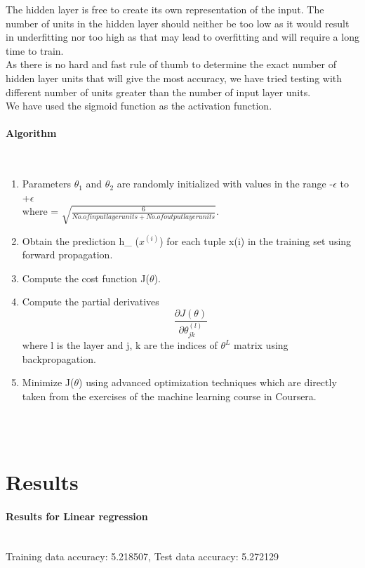 \documentclass[10pt]{article}
\begin{document}
The hidden layer is free to create its own representation of the input. The number of units in the hidden layer should neither be too low as it would result in underfitting nor too high as that may lead to overfitting and will require a long time to train.\\

As there is no hard and fast rule of thumb to determine the exact number of hidden layer units that will give the most accuracy, we have tried testing with different number of units greater than the number of input layer units.\\

We have used the sigmoid function as the activation function.

\paragraph{Algorithm}\\
\begin{enumerate}
	\item Parameters $\theta_1$ and $\theta_2$ are randomly initialized with values in the range -$\epsilon$ to +$\epsilon$\\ where \epsilon = $\sqrt{\frac{6}{No. of input layer units + No. of output layer units}}$.
	\item Obtain the prediction h_{\theta} ($x^{(i)}$) for each tuple x(i) in the training set using forward propagation.
	\item Compute the cost function J($\theta$).
	\item Compute the partial derivatives \[ \frac{\partial J(\theta)}{\partial \theta_{jk}^{(l)}} \] where l is the layer and j, k are the indices of $\theta^L$ matrix  using backpropagation.  
	\item Minimize J($\theta$) using advanced optimization techniques which are directly taken from the exercises of the machine learning course in Coursera. 
\end{enumerate}
\\\\
\section{Results}
\paragraph{Results for Linear regression}\\
Training data accuracy: 5.218507, 
Test data accuracy: 5.272129
\end{document}
